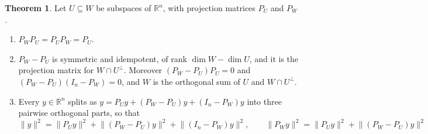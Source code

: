 \documentclass[12pt]{article}
\newcommand{\R}{\mathbb R}
\theoremstyle{definition}
\newtheorem{theorem}{Theorem}
\begin{document}
\begin{theorem}\label{r6-thm-nested}
Let \(U\subseteq W\) be subspaces of \(\R^n\), with projection matrices \(P_U\) and \(P_W\).
\begin{enumerate}
\item \(P_WP_U=P_UP_W=P_U\).
\item \(P_W-P_U\) is symmetric and idempotent, of rank \(\dim W-\dim U\), and it is the projection matrix for
\(W\cap U^\perp\). Moreover \((P_W-P_U)P_U=0\) and \((P_W-P_U)(I_n-P_W)=0\), and \(W\) is the orthogonal sum
of \(U\) and \(W\cap U^\perp\).
\item Every \(y\in\R^n\) splits as \(y=P_Uy+(P_W-P_U)y+(I_n-P_W)y\) into three pairwise orthogonal parts, so that
\[
\lVert y\rVert^2=\lVert P_Uy\rVert^2+\lVert(P_W-P_U)y\rVert^2+\lVert(I_n-P_W)y\rVert^2,\qquad
\lVert P_Wy\rVert^2=\lVert P_Uy\rVert^2+\lVert(P_W-P_U)y\rVert^2
\]
\end{enumerate}
\end{theorem}
\end{document}
